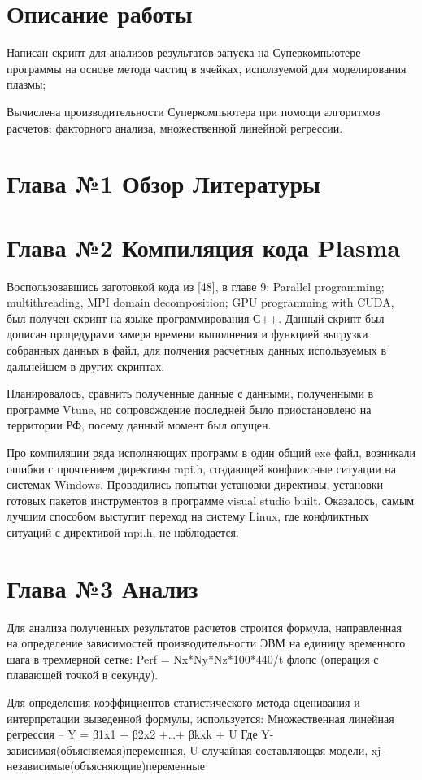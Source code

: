 \documentclass{article}
\begin{document}
\section{Описание работы}
Написан скрипт для анализов результатов запуска на Суперкомпьютере программы на основе метода частиц в ячейках, исползуемой для моделирования плазмы;

Вычислена производительности Суперкомпьютера при помощи алгоритмов расчетов: факторного анализа, множественной линейной регрессии.

\section{Глава №1 Обзор Литературы}

\section{Глава №2 Компиляция кода Plasma}
Воспользовавшись заготовкой кода из [48], в главе 9: Parallel programming; multithreading, MPI domain decomposition; GPU programming with CUDA, был получен скрипт на языке программирования С++. Данный скрипт был дописан процедурами замера времени выполнения и функцией выгрузки собранных данных в файл, для полчения расчетных данных используемых в дальнейшем в других скриптах.

Планировалось, сравнить полученные данные с данными, полученными в программе Vtune, но сопровождение последней было приостановлено на территории РФ, посему данный момент был опущен.

Про компиляции ряда исполняющих программ в один общий exe файл, возникали ошибки с прочтением директивы mpi.h, создающей конфликтные ситуации на системах Windows.
Проводились попытки установки директивы, установки готовых пакетов инструментов в программе visual studio built. Оказалось, самым лучшим способом выступит переход на систему Linux, где конфликтных ситуаций с директивой mpi.h, не наблюдается.

\section{Глава №3 Анализ}
Для анализа полученных результатов расчетов строится формула, направленная на определение зависимостей производительности ЭВМ  на единицу временного шага в трехмерной сетке: Perf = Nx*Ny*Nz*100*440/t флопс (операция с плавающей точкой в секунду).

Для определения коэффициентов статистического метода оценивания и интерпретации выведенной формулы, используется:
Множественная линейная регрессия – Y = β1x1 + β2x2 +…+ βkxk + U
Где Y-зависимая(объясняемая)переменная, U-случайная составляющая модели, xj-независимые(объясняющие)переменные
\end{document}
